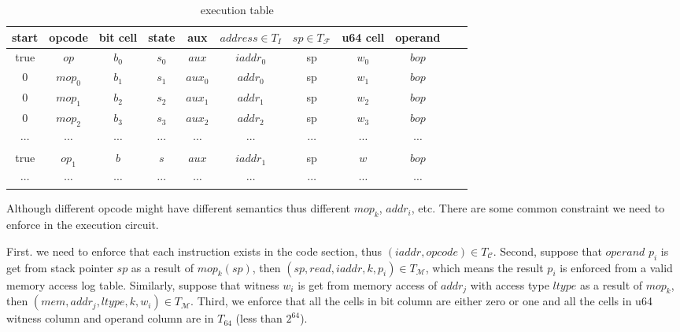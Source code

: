 \begin{table}[!h]
\begin{center}
\begin{tabular}{ | c | c | c | c | c | c | c | c | c | c | c | }
  \hline
  start & opcode & bit cell & state & aux & $address \in T_{I}$ & $sp \in T_\mathcal{F}$& u64 cell & operand \\ 
  \hline
   true & $op$ & $b_0$ & $s_0$ & $aux$ & $iaddr_0$ & sp & $w_0$ & $bop$\\ 
 \hline
   0 & $mop_0$ & $b_1$ & $s_1$ & $aux_0$ & $addr_0$ & sp & $w_1$ & $bop$\\ 
 \hline
   0 & $mop_1$ & $b_2$ & $s_2$ & $aux_1$ & $addr_1$ & sp & $w_2$ & $bop$\\ 
 \hline 
  0 & $mop_2$ & $b_3$ & $s_3$ & $aux_2$ & $addr_2$ & sp & $w_3$ & $bop$\\ 
 \hline
   $\cdots$ & $\cdots$ & $\cdots$ & $\cdots$ & $\cdots$ & $\cdots$ & $\cdots$ & $\cdots$ & $\cdots$\\ 
 \hline
   true & $op_1$ & $b$ & $s$ & $aux$ & $iaddr_1$ & sp & $w$ & $bop$\\ 
 \hline
   $\cdots$ & $\cdots$ & $\cdots$ & $\cdots$ & $\cdots$ & $\cdots$ & $\cdots$ & $\cdots$ & $\cdots$\\
 \hline
 \hline
\end{tabular}
\caption{execution table}
\label{tbl:ex-table}
\end{center}
\end{table}
Although different opcode might have different semantics thus different $mop_k$, $addr_i$, etc. There are some common constraint we need to enforce in the execution circuit.

First. we need to enforce that each instruction exists in the code section, thus $(iaddr, opcode) \in T_\mathcal{C}$. Second, suppose that $operand$ $p_i$ is get from stack pointer $sp$ as a result of $mop_k(sp)$, then $(sp, read, iaddr, k, p_i) \in T_{\mathcal{M}}$, which means the result $p_i$ is enforced from a valid memory access log table. Similarly, suppose that witness $w_i$ is get from memory access of $addr_j$ with access type $ltype$ as a result of $mop_k$, then $(mem, addr_j, ltype, k, w_i) \in T_{\mathcal{M}}$.  Third, we enforce that all the cells in bit column are either zero or one and all the cells in u64 witness column and operand column are in $T_64$ (less than $2^{64}$).
